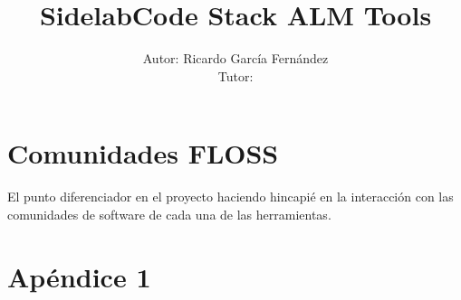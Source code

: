 \documentclass[a4paper, 12pt]{book}
\title{\textbf{SidelabCode Stack ALM Tools}}
\author{Autor: Ricardo Garc\'ia Fern\'andez
\\Tutor: }
\begin{document}
\renewcommand{\refname}{Bibliograf\'ia}  %
\renewcommand{\appendixname}{Ap\'endice}





\tableofcontents  %

\newpage

\listoffigures  %

\newpage

\listoftables %

\newpage

















\chapter{Comunidades FLOSS}
\label{chap:comunidades}

\par El punto diferenciador en el proyecto haciendo hincapi\'e en la interacci\'on con las comunidades de software de cada una de las herramientas.








\appendix
\chapter{Apéndice 1}
\label{app:primer}
\end{document}
